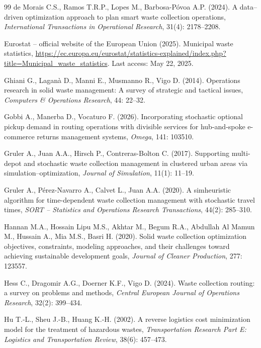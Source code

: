 \documentclass[preprint,11pt,authoryear]{elsarticle}
\begin{document}
\begin{thebibliography}{99}
de Morais C.S., Ramos T.R.P., Lopes M., Barbosa-Póvoa A.P. (2024). A data--driven optimization approach to plan smart waste collection operations, \textit{International Transactions in Operational Research}, 31(4): 2178--2208.

Eurostat -- official website of the European Union (2025). Municipal waste statistics, \url{https://ec.europa.eu/eurostat/statistics-explained/index.php?title=Municipal_waste_statistics}. Last access: May 22, 2025.

Ghiani G., Laganà D., Manni E., Musmanno R., Vigo D. (2014). Operations research in solid waste management: A survey of strategic and tactical issues, \textit{Computers \& Operations Research}, 44: 22--32. 

Gobbi A., Manerba D., Vocaturo F. (2026). Incorporating stochastic optional pickup demand in routing operations with divisible services for hub-and-spoke e-commerce returns management systems, \textit{Omega}, 141: 103510. 

Gruler A., Juan A.A., Hirsch P., Contreras-Bolton C. (2017). Supporting multi-depot and stochastic waste collection management in clustered urban areas via simulation–optimization, \textit{Journal of Simulation}, 11(1): 11--19.

Gruler A., Pérez-Navarro A., Calvet L.,  Juan A.A. (2020). A simheuristic algorithm for time-dependent
 waste collection management with stochastic
 travel times, \textit{SORT -- Statistics and Operations Research Transactions}, 44(2): 285--310.

Hannan M.A., Hossain Lipu M.S., Akhtar M., Begum R.A., Abdullah Al Mamun M., Hussain A., Mia M.S., Basri H. (2020). Solid waste collection optimization objectives, constraints, modeling approaches, and their challenges toward achieving sustainable development goals, \textit{Journal of Cleaner Production}, 277: 123557. 

Hess C., Dragomir A.G., Doerner K.F., Vigo D. (2024). Waste collection routing: a survey on problems and methods,
\textit{Central European Journal of Operations Research}, 32(2): 399--434.

Hu T.-L., Sheu J.-B., Huang K.-H. (2002). A reverse logistics cost minimization model for the treatment of hazardous wastes, \textit{Transportation Research Part E: Logistics and Transportation Review}, 38(6): 457--473. 


\end{thebibliography}
\end{document}
